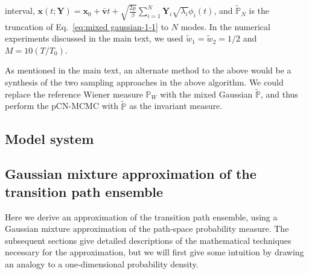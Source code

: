 interval, $\mathbf{x}(t;\mathbf{Y})=\mathbf{x}_{0}+\bar{\mathbf{v}}t+\sqrt{\frac{2\mu}{\beta}}\sum_{i=1}^{N}\mathbf{Y}_{i}\sqrt{\lambda_{i}}\phi_{i}(t)$,
and $\tilde{\mathbb{P}}_{N}$ is the truncation of Eq.~\eqref{eq:mixed gaussian-1-1}
to $N$ modes. In the numerical experiments discussed in the main
text, we used $\tilde{w}_{1}=\tilde{w}_{2}=1/2$ and $M=10(T/T_{0})$.

As mentioned in the main text, an alternate method to the above would
be a synthesis of the two sampling approaches in the above algorithm.
We could replace the reference Wiener measure $\mathbb{P}_{W}$ with
the mixed Gaussian $\tilde{\mathbb{P}}$, and thus perform the pCN-MCMC
with $\tilde{\mathbb{P}}$ as the invariant measure.


\subsection{Model system}




\subsection{Gaussian mixture approximation of the transition path ensemble}

Here we derive an approximation of the transition path ensemble, using
a Gaussian mixture approximation of the path-space probability measure.
The subsequent sections give detailed descriptions of the mathematical
techniques necessary for the approximation, but we will first give
some intuition by drawing an analogy to a one-dimensional probability
density.

